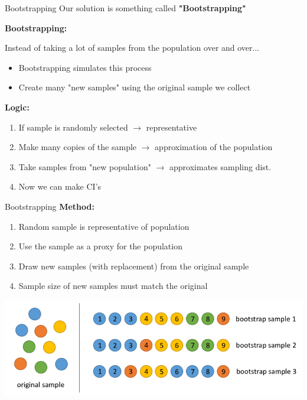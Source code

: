 \documentclass{beamer}
\begin{document}
\begin{frame}{Bootstrapping}
Our solution is something called \textbf{"Bootstrapping"}
\vspace{8mm}

\textbf{Bootstrapping:} 

Instead of taking a lot of samples from the population over and over...
\begin{itemize}
    \item Bootstrapping simulates this process
    \item Create many "new samples" using the original sample we collect
\end{itemize} \vspace{8mm}

\textbf{Logic:}
\begin{enumerate}
    \item If sample is randomly selected $\rightarrow$ representative
    \item Make many copies of the sample $\rightarrow$ approximation of the population
    \item Take samples from "new population" $\rightarrow$ approximates sampling dist.
    \item Now we can make CI's
\end{enumerate}
\end{frame}

\begin{frame}{Bootstrapping}
\textbf{Method:}
\begin{enumerate}
    \item Random sample is representative of population
    \item Use the sample as a proxy for the population
    \item Draw new samples (with replacement) from the original sample
    \item Sample size of new samples must match the original
\end{enumerate}

\begin{center}
    \includegraphics[scale=.4]{img/bootstrap_pic.png}
\end{center}
\end{frame}
\end{document}
